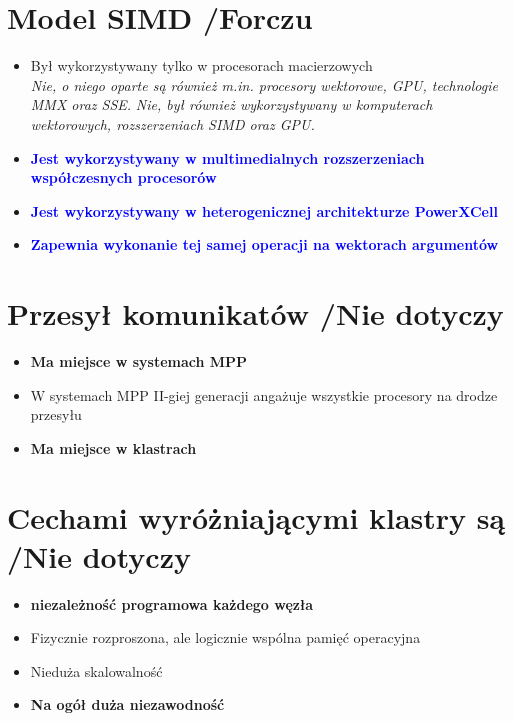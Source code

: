 \documentclass[a4paper,twoside]{article}
\begin{document}
\section{Model SIMD  {\small /Forczu}}
	\begin{itemize}
    \item Był wykorzystywany tylko w procesorach macierzowych\\
    {\small \emph{Nie, o niego oparte są również m.in. procesory wektorowe, GPU, technologie MMX oraz SSE.}}
    {\small \emph{Nie, był również wykorzystywany w komputerach wektorowych, rozszerzeniach SIMD oraz GPU.}}
    \item \textcolor{Blue}{\textbf{Jest wykorzystywany w multimedialnych rozszerzeniach współczesnych procesorów}}
    \item \textcolor{Blue}{\textbf{Jest wykorzystywany w heterogenicznej architekturze PowerXCell}}
    \item \textcolor{Blue}{\textbf{Zapewnia wykonanie tej samej operacji na wektorach argumentów}}
    \end{itemize}

\section{Przesył komunikatów {\small /Nie dotyczy}}
	\begin{itemize}
    \item \textbf{Ma miejsce w systemach MPP}
    \item W systemach MPP II-giej generacji angażuje wszystkie procesory na drodze przesyłu
    \item \textbf{Ma miejsce w klastrach}
    \end{itemize}

\section{Cechami wyróżniającymi klastry są {\small /Nie dotyczy}}
	\begin{itemize}
    \item \textbf{niezależność programowa każdego węzła}
    \item Fizycznie rozproszona, ale logicznie wspólna pamięć operacyjna
    \item Nieduża skalowalność
    \item \textbf{Na ogół duża niezawodność}
    \end{itemize}
\end{document}
